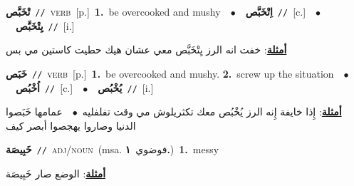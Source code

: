 \documentclass[10pt,a4paper,twoside]{article} %
\begin{document}
\begin{multicols}{2}
{\setlength\topsep{0pt}\textbf{\foreignlanguage{arabic}{تْخَبَّص}}\ {\color{gray}\texttt{//}\color{black}}\ \textsc{verb}\ [p.]\ \textbf{1.}~be overcooked and mushy\ \ $\bullet$\ \ \setlength\topsep{0pt}\textbf{\foreignlanguage{arabic}{اِتْخَبَّص}}\ {\color{gray}\texttt{//}\color{black}}\ [c.]\ \ $\bullet$\ \ \setlength\topsep{0pt}\textbf{\foreignlanguage{arabic}{يِتْخَبَّص}}\ {\color{gray}\texttt{//}\color{black}}\ [i.]\  \begin{flushright}\color{gray}\foreignlanguage{arabic}{\textbf{\underline{\foreignlanguage{arabic}{أمثلة}}}: خفت انه الرز يِتْخَبَّص معي عشان هيك حطيت كاستين مي بس}\end{flushright}\color{black}} \vspace{2mm}

{\setlength\topsep{0pt}\textbf{\foreignlanguage{arabic}{خَبَص}}\ {\color{gray}\texttt{//}\color{black}}\ \textsc{verb}\ [p.]\ \textbf{1.}~be overcooked and mushy.  \textbf{2.}~screw up the situation\ \ $\bullet$\ \ \setlength\topsep{0pt}\textbf{\foreignlanguage{arabic}{اُخْبُص}}\ {\color{gray}\texttt{//}\color{black}}\ [c.]\ \ $\bullet$\ \ \setlength\topsep{0pt}\textbf{\foreignlanguage{arabic}{يُخْبُص}}\ {\color{gray}\texttt{//}\color{black}}\ [i.]\  \begin{flushright}\color{gray}\foreignlanguage{arabic}{\textbf{\underline{\foreignlanguage{arabic}{أمثلة}}}: إِذا خايفة إِنه الرز يُخْبُص معك تكثريلوش مي وقت تفلفليه\ $\bullet$\ \  عمامها خَبَصوا الدنيا وصاروا يهجصوا أبصر كيف}\end{flushright}\color{black}} \vspace{2mm}

{\setlength\topsep{0pt}\textbf{\foreignlanguage{arabic}{خَبِيصَة}}\ {\color{gray}\texttt{//}\color{black}}\ \textsc{adj/noun}\ \color{gray}(msa. \foreignlanguage{arabic}{فوضوي}~\foreignlanguage{arabic}{\textbf{١.}})\color{black}\ \textbf{1.}~messy\  \begin{flushright}\color{gray}\foreignlanguage{arabic}{\textbf{\underline{\foreignlanguage{arabic}{أمثلة}}}: الوضع صار خَبِيصَة}\end{flushright}\color{black}} \vspace{2mm}


\end{multicols}
\end{document}
